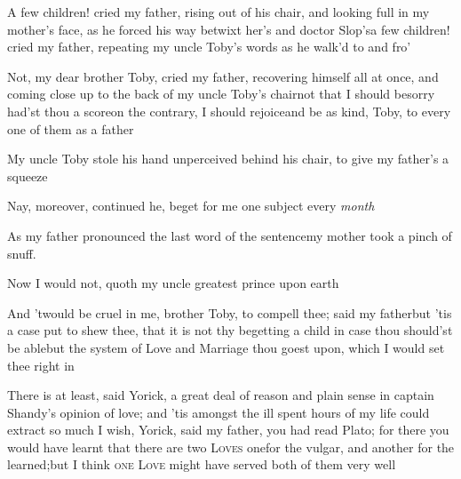\documentclass{article}
\begin{document}
\tsh A few children! cried my father, rising out of his
chair, and looking full in my mother’s face, as he forced his
way betwixt her’s and doctor Slop’s\tsk a few children! cried my father, repeating my uncle
Toby’s words as he walk’d to and
fro’\tsh

\tsh Not, my dear brother Toby, cried my father, recovering
himself all at once, and coming close up to the back of my uncle
Toby’s chair\tsk not that I should be\break sorry had’st thou a
score\tsk on the contrary, I should rejoice\tsk and be as kind,
Toby, to every one of them as a father\tsk 

My uncle Toby stole his hand unperceived behind his
chair, to give my father’s a squeeze\tsh

\tsh Nay, moreover, continued he,\break
{}
beget for me one subject every \textit{month}\tsh

As my father pronounced the last word of the sentence\tsk my
mother took a pinch of snuff.

Now I would not, quoth my uncle
greatest prince upon earth\tsh

\tsh And ’twould be cruel in me, brother
Toby, to compell thee; said my father\tsk but ’tis a
case put to shew thee, that it is not thy begetting a
child\break
\tsk in case thou should’st be able\tsk but the
system of Love and Marriage thou goest upon, which I would set thee
right in\tsh

There is at least, said Yorick, a great deal of reason
and plain sense in captain Shandy’s opinion of love;
and ’tis amongst the ill spent hours of my life
could extract so much\tsh\etp{}
I wish, Yorick, said my father, you\break 
had read Plato; for there you would have learnt that there are two
\textsc{Loves}\tsk\break 
{}
one\tsk for the vulgar, and another for the
learned;\tsk but I think \textsc{one Love}
might have served both of them very well\tsk 
\end{document}
